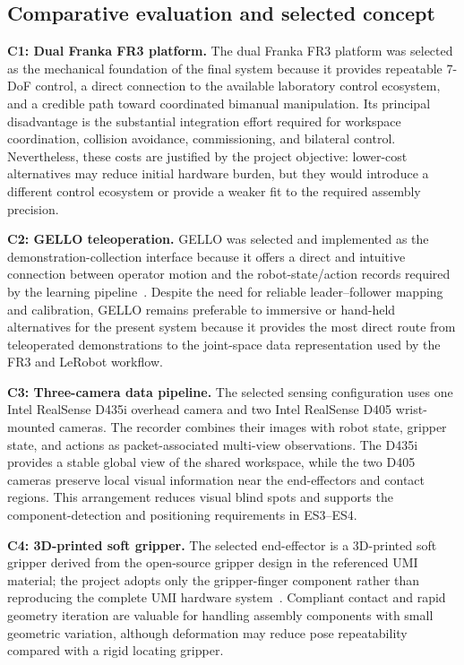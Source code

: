\subsection{Comparative evaluation and selected concept}

\noindent\textbf{C1: Dual Franka FR3 platform.}
The dual Franka FR3 platform was selected as the mechanical foundation of the final system because it provides repeatable 7-DoF control, a direct connection to the available laboratory control ecosystem, and a credible path toward coordinated bimanual manipulation. Its principal disadvantage is the substantial integration effort required for workspace coordination, collision avoidance, commissioning, and bilateral control. Nevertheless, these costs are justified by the project objective: lower-cost alternatives may reduce initial hardware burden, but they would introduce a different control ecosystem or provide a weaker fit to the required assembly precision.

\noindent\textbf{C2: GELLO teleoperation.}
GELLO was selected and implemented as the demonstration-collection interface because it offers a direct and intuitive connection between operator motion and the robot-state/action records required by the learning pipeline~\cite{gello}. Despite the need for reliable leader--follower mapping and calibration, GELLO remains preferable to immersive or hand-held alternatives for the present system because it provides the most direct route from teleoperated demonstrations to the joint-space data representation used by the FR3 and LeRobot workflow.

\noindent\textbf{C3: Three-camera data pipeline.}
The selected sensing configuration uses one Intel RealSense D435i overhead camera and two Intel RealSense D405 wrist-mounted cameras. The recorder combines their images with robot state, gripper state, and actions as packet-associated multi-view observations. The D435i provides a stable global view of the shared workspace, while the two D405 cameras preserve local visual information near the end-effectors and contact regions. This arrangement reduces visual blind spots and supports the component-detection and positioning requirements in ES3--ES4.

\noindent\textbf{C4: 3D-printed soft gripper.}
The selected end-effector is a 3D-printed soft gripper derived from the open-source gripper design in the referenced UMI material; the project adopts only the gripper-finger component rather than reproducing the complete UMI hardware system~\cite{umi}. Compliant contact and rapid geometry iteration are valuable for handling assembly components with small geometric variation, although deformation may reduce pose repeatability compared with a rigid locating gripper.

